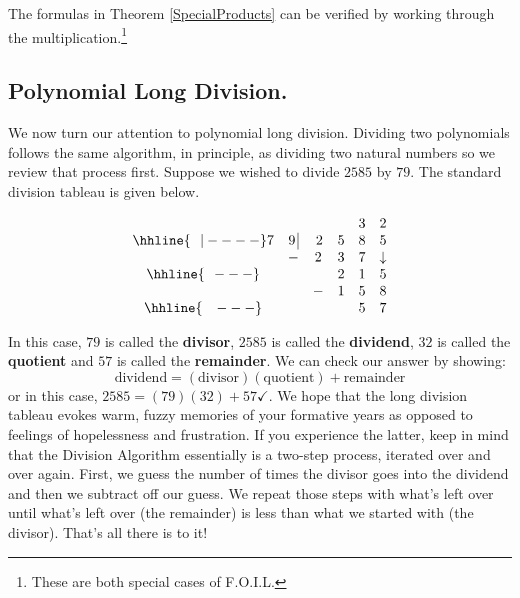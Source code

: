 \medskip

The formulas in Theorem \ref{SpecialProducts} can be verified by working through the multiplication.\footnote{These are both special cases of F.O.I.L.}

\subsection{Polynomial Long Division.}
\label{polylongdiv}

We now turn our attention to polynomial long division.  Dividing two polynomials follows the same algorithm, in principle, as dividing two natural numbers so we review that process first.  Suppose we wished to divide $2585$ by $79$.  The standard division tableau is given below. 

\setlength\arraycolsep{0.1pt}
\setlength\extrarowheight{2pt}

\[ \begin{array}{cccccc}

    &             &      &    & 3   & 2  \\ \hhline{~~|----}

  7 & 9 \, \vline & \, 2 & 5 & 8 & 5  \\

    &            -&    2 & 3 & 7 & \downarrow \\ \hhline{~~---} 
    &             &      & 2 & 1 &  5   \\ 
    &             &     - & 1 & 5 & 8    \\ \hhline{~~~---} 
    &             &      &   & 5 & 7    \\

 
\end{array}\]

\setlength\arraycolsep{5pt}
\setlength\extrarowheight{0pt}

In this case, $79$ is called the \textbf{divisor}, $2585$ is called the \textbf{dividend}, $32$ is called the \textbf{quotient} and $57$ is called the \textbf{remainder}.  We can check our answer by showing:  \[ \text{dividend} = (\text{divisor})( \text{quotient}) + \text{remainder}\] or in this case, $2585 = 
 (79)(32) + 57 \checkmark$.  We hope that the long division tableau evokes warm, fuzzy memories of your formative years as opposed to feelings of hopelessness and frustration.  If you experience the latter, keep in mind that the Division Algorithm essentially is a two-step process, iterated over and over again.  First, we guess the number of times the divisor goes into the dividend and  then we subtract off our guess.  We repeat those steps with what's left over until what's left over (the remainder) is less than what we started with (the divisor).  That's all there is to it!

